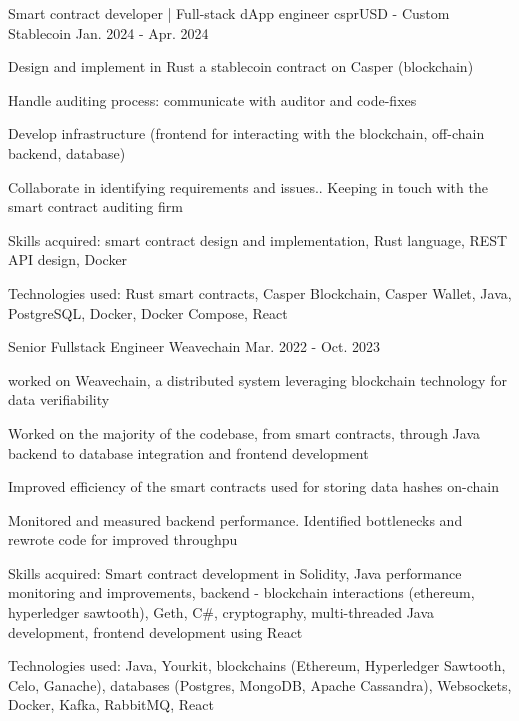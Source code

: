 \begin{cventries}
  \cventry
    {Smart contract developer | Full-stack dApp engineer} %
    {csprUSD - Custom Stablecoin} %
    {} %
    {Jan. 2024 - Apr. 2024} %
    {
      \begin{cvitems} %
        \item {Design and implement in Rust a stablecoin contract on Casper (blockchain)}
        \item {Handle auditing process: communicate with auditor and code-fixes}
        \item {Develop infrastructure (frontend for interacting with the blockchain, off-chain backend, database)}
        \item {Collaborate in identifying requirements and issues.. Keeping in touch with the smart contract auditing firm}
        \item {Skills acquired: smart contract design and implementation, Rust language, REST API design, Docker}
        \item {Technologies used: Rust smart contracts, Casper Blockchain, Casper Wallet, Java, PostgreSQL, Docker, Docker Compose, React}
      \end{cvitems}
    }

  \cventry
    {Senior Fullstack Engineer} %
    {Weavechain} %
    {} %
    {Mar. 2022 - Oct. 2023} %
    {
      \begin{cvitems} %
        \item {worked on Weavechain, a distributed system leveraging blockchain technology for data verifiability}
        \item {Worked on the majority of the codebase, from smart contracts, through Java backend to database integration and frontend development}
        \item {Improved efficiency of the smart contracts used for storing data hashes on-chain}
        \item {Monitored and measured backend performance. Identified bottlenecks and rewrote code for improved throughpu}
        \item {Skills acquired: Smart contract development in Solidity, Java performance monitoring and improvements, backend - blockchain interactions (ethereum, hyperledger sawtooth), Geth, C\#, cryptography, multi-threaded Java development, frontend development using React}
        \item {Technologies used: Java, Yourkit, blockchains (Ethereum, Hyperledger Sawtooth, Celo, Ganache), databases (Postgres, MongoDB, Apache Cassandra), Websockets, Docker, Kafka, RabbitMQ, React}
      \end{cvitems}
    }
    

\end{cventries}
